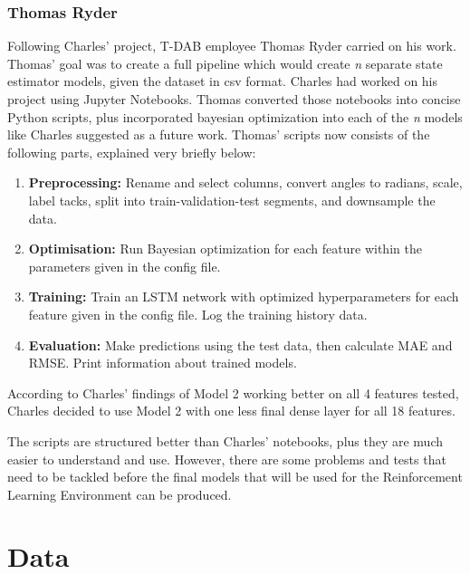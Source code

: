 \documentclass[12pt,twoside]{report}
\begin{document}
\subsection{Thomas Ryder}

Following Charles' project, T-DAB employee Thomas Ryder carried on his work. Thomas' goal was to create a full pipeline which would create \emph{n} separate state estimator models, given the dataset in csv format. Charles had worked on his project using Jupyter Notebooks. Thomas converted those notebooks into concise Python scripts, plus incorporated bayesian optimization into each of the \emph{n} models like Charles suggested as a future work. Thomas' scripts now consists of the following parts, explained very briefly below:

\begin{enumerate}
  \item \textbf{Preprocessing:} Rename and select columns, convert angles to radians, scale, label tacks, split into train-validation-test segments, and downsample the data.
  \item \textbf{Optimisation:} Run Bayesian optimization for each feature within the parameters given in the config file.
  \item \textbf{Training:} Train an LSTM network with optimized hyperparameters for each feature given in the config file. Log the training history data.
  \item \textbf{Evaluation:} Make predictions using the test data, then calculate MAE and RMSE. Print information about trained models.
\end{enumerate}

According to Charles' findings of Model 2 working better on all 4 features tested, Charles decided to use Model 2 with one less final dense layer for all 18 features.

The scripts are structured better than Charles' notebooks, plus they are much easier to understand and use. However, there are some problems and tests that need to be tackled before the final models that will be used for the Reinforcement Learning Environment can be produced.


%

\chapter{Data}
\end{document}
